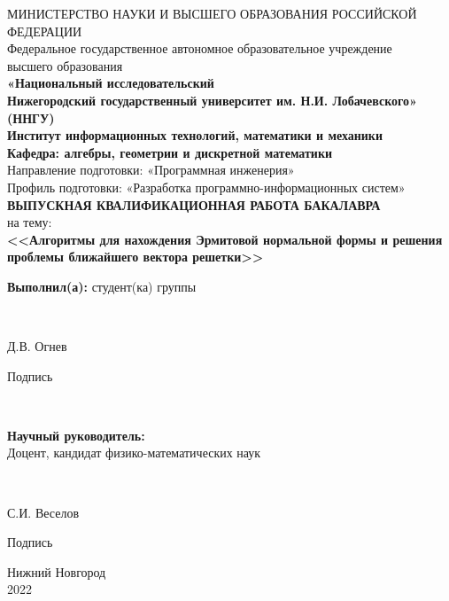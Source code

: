 \begin{titlepage}
\newpage

\begin{center}
	МИНИСТЕРСТВО НАУКИ И ВЫСШЕГО ОБРАЗОВАНИЯ РОССИЙСКОЙ ФЕДЕРАЦИИ \\
	\fontsize{14}{12}\selectfont
	Федеральное государственное автономное образовательное учреждение\\ высшего образования \\
	
	\textbf
	{«Национальный исследовательский \\ Нижегородский государственный
	 университет им. Н.И. Лобачевского» \\ (ННГУ)} \\
	\hfill \break
	\hfill \break
	\hfill \break
	\textbf{Институт информационных технологий, математики и механики} \\
	\hfill \break
	\hfill \break
	\textbf{Кафедра: алгебры, геометрии и дискретной математики} \\
	\hfill \break
	\hfill \break
	Направление подготовки: «Программная инженерия» \\
	\fontsize{13}{12}\selectfont
	Профиль подготовки: «Разработка программно-информационных систем» \\
	\fontsize{14}{12}\selectfont
	\hfill \break
	\hfill \break
	\hfill \break
	\textbf{ВЫПУСКНАЯ КВАЛИФИКАЦИОННАЯ РАБОТА БАКАЛАВРА} \\
	\vspace{1em}
	на тему: \\
	\textbf{<<Алгоритмы для нахождения Эрмитовой нормальной формы и решения проблемы ближайшего вектора решетки>>} \\
\end{center}

\vspace{7em}

\fontsize{14}{12}\selectfont
\hfill\parbox{8cm}{
	\textbf{Выполнил(а):} студент(ка) группы \makebox[1cm]{\hrulefill}
} \\
\vspace{1em}
\hfill\parbox{7cm}{
	\underline{\hspace{4cm}} Д.В. Огнев
	\begin{center}
	Подпись
	\end{center}
}\\
\vspace{1em}
\hfill\parbox{8cm}{
	\textbf{Научный руководитель:} \\
	Доцент, кандидат физико-математических наук
} \\
\vspace{1em}
\hfill\parbox{7cm}{
	\underline{\hspace{4cm}} С.И. Веселов
	\begin{center}
	Подпись
	\end{center}
}


\vspace{\fill}

\begin{center}
Нижний Новгород \\2022
\end{center}

\end{titlepage}
\clearpage